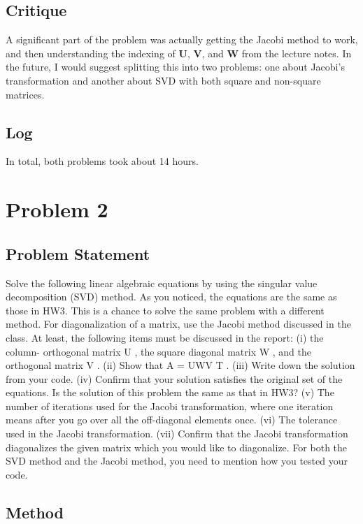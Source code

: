 \documentclass[10pt,letter]{article}
\begin{document}
\subsection{Critique}

A significant part of the problem was actually getting the Jacobi method to work, and then understanding the indexing of \textbf{U}, \textbf{V}, and \textbf{W} from the lecture notes. In the future, I would suggest splitting this into two problems: one about Jacobi's transformation and another about SVD with both square and non-square matrices.

\subsection{Log}

In total, both problems took about 14 hours.


\section{Problem 2}

\subsection{Problem Statement}
Solve the following linear algebraic equations by using the singular value decomposition (SVD)
method. As you noticed, the equations are the same as those in HW3. This is a chance to solve
the same problem with a different method. For diagonalization of a matrix, use the Jacobi method
discussed in the class. At least, the following items must be discussed in the report: (i) the column-
orthogonal matrix U , the square diagonal matrix W , and the orthogonal matrix V . (ii) Show that
A = UWV T . (iii) Write down the solution from your code. (iv) Confirm that your solution satisfies
the original set of the equations. Is the solution of this problem the same as that in HW3? (v)
The number of iterations used for the Jacobi transformation, where one iteration means after you
go over all the off-diagonal elements once. (vi) The tolerance used in the Jacobi transformation.
(vii) Confirm that the Jacobi transformation diagonalizes the given matrix which you would like to
diagonalize. For both the SVD method and the Jacobi method, you need to mention how you tested
your code.

\subsection{Method}
\end{document}
